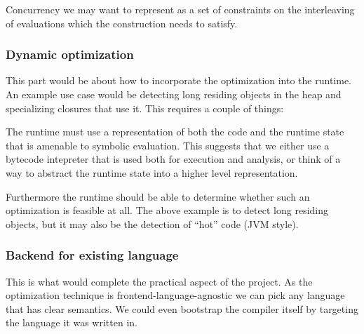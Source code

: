 \documentclass[a4paper]{article}
\begin{document}
Concurrency we may want to represent as a set of constraints on the interleaving of evaluations which the construction needs to satisfy.

\subsubsection*{Dynamic optimization}

This part would be about how to incorporate the optimization into the runtime. An example use case would be detecting long residing objects in the heap and specializing closures that use it. This requires a couple of things:

The runtime must use a representation of both the code and the runtime state that is amenable to symbolic evaluation. This suggests that we either use a bytecode intepreter that is used both for execution and analysis, or think of a way to abstract the runtime state into a higher level representation.

Furthermore the runtime should be able to determine whether such an optimization is feasible at all. The above example is to detect long residing objects, but it may also be the detection of ``hot'' code (JVM style).

\subsubsection*{Backend for existing language}

This is what would complete the practical aspect of the project. As the optimization technique is frontend-language-agnostic we can pick any language that has clear semantics. We could even bootstrap the compiler itself by targeting the language it was written in.



\end{document}
